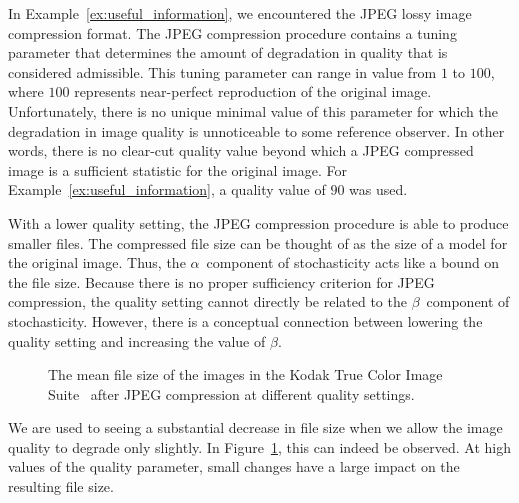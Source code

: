 \begin{example}
  In Example~\ref{ex:useful_information}, we encountered the JPEG lossy image compression format.
  The JPEG compression procedure contains a tuning parameter that determines the amount of degradation in quality that is considered admissible.
  This tuning parameter can range in value from $1$ to $100$, where $100$ represents near-perfect reproduction of the original image.
  Unfortunately, there is no unique minimal value of this parameter for which the degradation in image quality is unnoticeable to some reference observer.
  In other words, there is no clear-cut quality value beyond which a JPEG compressed image is a sufficient statistic for the original image.
  For Example~\ref{ex:useful_information}, a quality value of $90$ was used.

  With a lower quality setting, the JPEG compression procedure is able to produce smaller files.
  The compressed file size can be thought of as the size of a model for the original image.
  Thus, the $\alpha$~component of stochasticity acts like a bound on the file size.
  Because there is no proper sufficiency criterion for JPEG compression, the quality setting cannot directly be related to the $\beta$~component of stochasticity.
  However, there is a conceptual connection between lowering the quality setting and increasing the value of $\beta$.

  \begin{figure}
    \centering
    \caption{
      The mean file size of the images in the Kodak True Color Image Suite~\parencite{franzen1999kodak} after JPEG compression at different quality settings.
    }
    \label{fig:jpeg_q}
  \end{figure}
  We are used to seeing a substantial decrease in file size when we allow the image quality to degrade only slightly.
  In Figure~\ref{fig:jpeg_q}, this can indeed be observed.
  At high values of the quality parameter, small changes have a large impact on the resulting file size.
\end{example}

